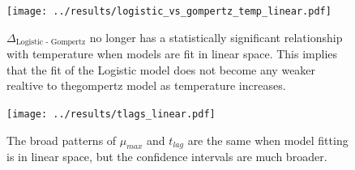 \documentclass[11pt, a4paper]{article}
\begin{document}
         \begin{figure}[H]
        \texttt{[image: ../results/logistic\_vs\_gompertz\_temp\_linear.pdf]}
        \centering
        \caption{$\Delta_{\text{Logistic - Gompertz}}$ no longer has a statistically significant relationship with temperature when models are fit in linear space. This implies that the fit of the Logistic model does not become any weaker realtive to thegompertz model as temperature increases.}
        \label{sup:logistic_temp_linear}
        \end{figure} 
        
        \begin{figure}[H]
        \texttt{[image: ../results/tlags\_linear.pdf]}
        \centering
        \caption{The broad patterns of $\mu_{max}$ and $t_{lag}$ are the same when model fitting is in linear space, but the confidence intervals are much broader.}
        \label{sup:params_linear}
        \end{figure} 
        
        
    
    
\end{document}

